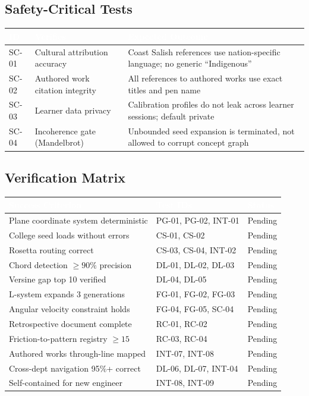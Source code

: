 \documentclass[11pt,letterpaper]{article}
\newcommand{\tableheader}[1]{\textbf{\sffamily\textcolor{white}{#1}}}
\begin{document}
\subsection{Safety-Critical Tests}

\begin{center}
\begin{tabularx}{\textwidth}{L{1.5cm}L{4cm}X}
\toprule
{}
\tableheader{ID} & \tableheader{Verifies} & \tableheader{Expected Outcome} \\
\midrule
SC-01 & Cultural attribution accuracy & Coast Salish references use nation-specific language; no generic ``Indigenous'' \\
SC-02 & Authored work citation integrity & All references to authored works use exact titles and pen name \\
SC-03 & Learner data privacy & Calibration profiles do not leak across learner sessions; default private \\
SC-04 & Incoherence gate (Mandelbrot) & Unbounded seed expansion is terminated, not allowed to corrupt concept graph \\
\bottomrule
\end{tabularx}
\end{center}

\subsection{Verification Matrix}

\begin{center}
\begin{tabularx}{\textwidth}{L{4.5cm}L{3cm}C{2cm}}
\toprule
{}
\tableheader{Success Criterion} & \tableheader{Test IDs} & \tableheader{Status} \\
\midrule
Plane coordinate system deterministic & PG-01, PG-02, INT-01 & Pending \\
College seed loads without errors & CS-01, CS-02 & Pending \\
Rosetta routing correct & CS-03, CS-04, INT-02 & Pending \\
Chord detection $\geq 90\%$ precision & DL-01, DL-02, DL-03 & Pending \\
Versine gap top 10 verified & DL-04, DL-05 & Pending \\
L-system expands 3 generations & FG-01, FG-02, FG-03 & Pending \\
Angular velocity constraint holds & FG-04, FG-05, SC-04 & Pending \\
Retrospective document complete & RC-01, RC-02 & Pending \\
Friction-to-pattern registry $\geq 15$ & RC-03, RC-04 & Pending \\
Authored works through-line mapped & INT-07, INT-08 & Pending \\
Cross-dept navigation 95\%+ correct & DL-06, DL-07, INT-04 & Pending \\
Self-contained for new engineer & INT-08, INT-09 & Pending \\
\bottomrule
\end{tabularx}
\end{center}
\end{document}
